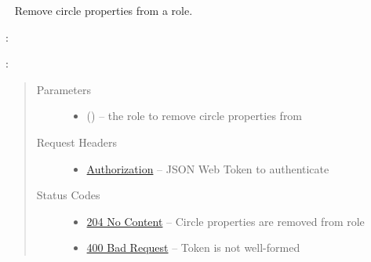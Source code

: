\documentclass[letterpaper,10pt,english]{sphinxmanual}
\begin{document}
\begin{fulllineitems}
\label{\detokenize{resources/role:delete--roles-(role_id)-circle}}~
Remove circle properties from a role.

:

\begin{sphinxVerbatim}[commandchars=\\\{\}]
  
 
 
\end{sphinxVerbatim}

:

\begin{sphinxVerbatim}[commandchars=\\\{\}]
  
\end{sphinxVerbatim}
\begin{quote}\begin{description}
\item[{Parameters}] \leavevmode\begin{itemize}
\item {} 
 () -- the role to remove circle properties from

\end{itemize}

\item[{Request Headers}] \leavevmode\begin{itemize}
\item {} 
\href{http://tools.ietf.org/html/rfc7235\#section-4.2}{Authorization} -- JSON Web Token to authenticate

\end{itemize}

\item[{Status Codes}] \leavevmode\begin{itemize}
\item {} 
\href{http://www.w3.org/Protocols/rfc2616/rfc2616-sec10.html\#sec10.2.5}{204 No Content} -- Circle properties are removed from role

\item {} 
\href{http://www.w3.org/Protocols/rfc2616/rfc2616-sec10.html\#sec10.4.1}{400 Bad Request} -- Token is not well-formed


\end{itemize}
\end{description}
\end{quote}
\end{fulllineitems}
\end{document}

